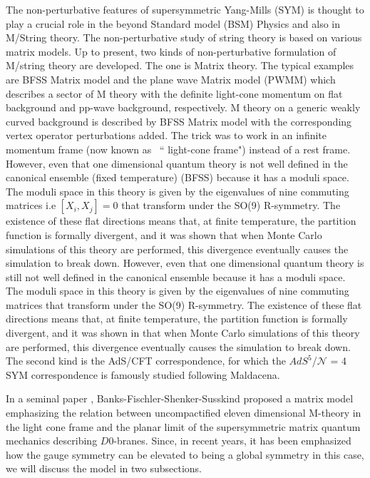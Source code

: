 \documentclass[11pt]{article}
\begin{document}
The non-perturbative features of supersymmetric Yang-Mills (SYM) is thought to play a crucial role in the beyond Standard model (BSM) Physics and also in M/String theory. The non-perturbative study of string theory is based on various matrix models. Up to present, two kinds of non-perturbative formulation of
M/string theory are developed. The one is Matrix theory.
The typical examples are BFSS Matrix model and the
plane wave Matrix model (PWMM) which  describes a sector
of M theory with the definite light-cone momentum on flat
background and pp-wave background, respectively. M theory
on a generic weakly curved background is described by
BFSS Matrix model with the corresponding vertex operator
perturbations added. The trick was to work in an infinite momentum frame (now known as ~`` light-cone frame") instead of a rest frame. However,
even that one dimensional quantum theory is not well defined in the canonical
ensemble (fixed temperature) (BFSS) because it has a moduli space. The moduli space in this theory is given
by the eigenvalues of nine commuting matrices i.e $ [X_{i}, X_{j}] = 0 $  that transform under the SO(9) R-symmetry.
The existence of these flat directions means that, at finite temperature,
the partition function is formally divergent, and it was shown that when Monte
Carlo simulations of this theory are performed, this divergence eventually causes the
simulation to break down.  However,
even that one dimensional quantum theory is still not well defined in the canonical
ensemble because it has a moduli space. The moduli space in this theory is given
by the eigenvalues of nine commuting matrices that transform under the SO(9) R-symmetry.
The existence of these flat directions means that, at finite temperature,
the partition function is formally divergent, and it was shown in that when Monte
Carlo simulations of this theory are performed, this divergence eventually causes the
simulation to break down. The second kind is the AdS/CFT
correspondence, for which the $AdS^{5}$/$\mathcal{N}$ = 4 SYM correspondence is famously studied following Maldacena.  


In a seminal paper \cite{Banks:1996vh}, Banks-Fischler-Shenker-Susskind proposed a matrix model emphasizing the relation between uncompactified eleven dimensional M-theory in the light cone frame and the planar limit of the supersymmetric matrix quantum mechanics describing $D0$-branes. Since, in recent years, it has been emphasized how the gauge symmetry can be elevated to being a global symmetry in this case, we will discuss the model in two subsections. 
\end{document}
